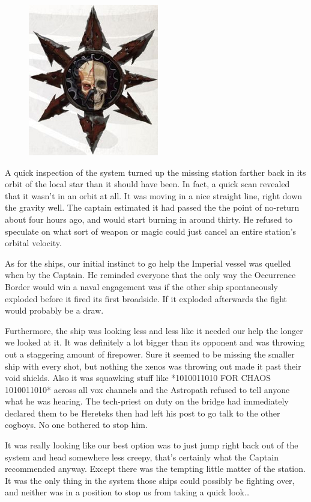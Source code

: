 \begin{figure}
	\begin{center}
		\includegraphics[width=\figwidth]{pics/11/42.png}
	\end{center}
\end{figure}
A quick  inspection of the system turned up the missing station farther back in its orbit of the local star than it should have been. 
In fact, a quick scan revealed that it wasn't in an orbit at all. 
It was moving in a nice straight line, right down the gravity well. 
The captain estimated it had passed the the point of no-return about four hours ago, and would start burning in around thirty. 
He refused to speculate on what sort of weapon or magic could just cancel an entire station's orbital velocity.

As for the ships, our initial instinct to go help the Imperial vessel was quelled when by the Captain. 
He reminded everyone that the only way the Occurrence Border would win a naval engagement was if the other ship spontaneously exploded before it fired its first broadside. 
If it exploded afterwards the fight would probably be a draw.

Furthermore, the ship was looking less and less like it needed our help the longer we looked at it. 
It was definitely a lot bigger than its opponent and was throwing out a staggering amount of firepower. 
Sure it seemed to be missing the smaller ship with every shot, but nothing the xenos was throwing out made it past their void shields. 
Also it was squawking stuff like *1010011010 FOR CHAOS 1010011010* across all vox channels and the Astropath refused to tell anyone what he was hearing. 
The tech-priest on duty on the bridge had immediately declared them to be Hereteks then had left his post to go talk to the other cogboys. 
No one bothered to stop him.

It was really looking like our best option was to just jump right back out of the system and head somewhere less creepy, that's certainly what the Captain recommended anyway. 
Except there was the tempting little matter of the station. 
It was the only thing in the system those ships could possibly be fighting over, and neither was in a position to stop us from taking a quick look…

